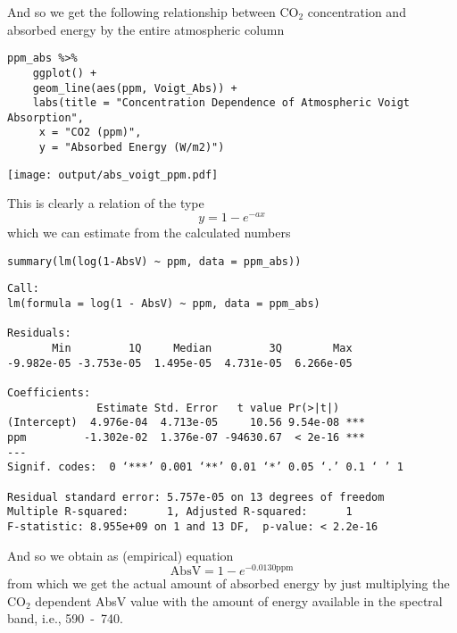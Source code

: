 \documentclass[10pt,a4paper,titlepage]{article}
\begin{document}
And so we get the following relationship between CO$_{\text{2}}$ concentration
and absorbed energy by the entire atmospheric column
\begin{lstlisting}
ppm_abs %>%
    ggplot() +
    geom_line(aes(ppm, Voigt_Abs)) +
    labs(title = "Concentration Dependence of Atmospheric Voigt Absorption",
	 x = "CO2 (ppm)",
	 y = "Absorbed Energy (W/m2)")
\end{lstlisting}

\texttt{[image: output/abs\_voigt\_ppm.pdf]}

This is clearly a relation of the type
\begin{equation}
y = 1 - e^{-a x}
\end{equation}
which we can estimate from the calculated numbers
\begin{lstlisting}
summary(lm(log(1-AbsV) ~ ppm, data = ppm_abs))
\end{lstlisting}

\begin{verbatim}
Call:
lm(formula = log(1 - AbsV) ~ ppm, data = ppm_abs)

Residuals:
       Min         1Q     Median         3Q        Max 
-9.982e-05 -3.753e-05  1.495e-05  4.731e-05  6.266e-05 

Coefficients:
              Estimate Std. Error   t value Pr(>|t|)    
(Intercept)  4.976e-04  4.713e-05     10.56 9.54e-08 ***
ppm         -1.302e-02  1.376e-07 -94630.67  < 2e-16 ***
---
Signif. codes:  0 ‘***’ 0.001 ‘**’ 0.01 ‘*’ 0.05 ‘.’ 0.1 ‘ ’ 1

Residual standard error: 5.757e-05 on 13 degrees of freedom
Multiple R-squared:      1,	Adjusted R-squared:      1 
F-statistic: 8.955e+09 on 1 and 13 DF,  p-value: < 2.2e-16
\end{verbatim}
And so we obtain as (empirical) equation
\begin{equation}
\mathrm{AbsV} = 1 - e^{-0.0130 \mathrm{ppm}}
\label{eqn:rel_absorption}
\end{equation}
from which we get the actual amount of absorbed energy by just
multiplying the CO$_{\text{2}}$ dependent AbsV value with the amount of energy
available in the spectral band, i.e.,
\unit{590-740}{\centi\reciprocal\metre}.
\end{document}
